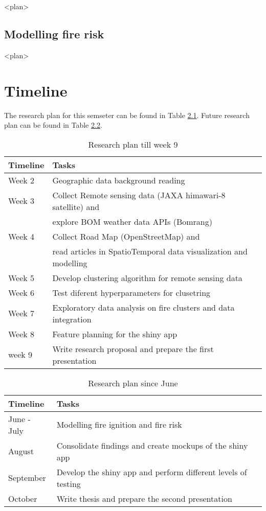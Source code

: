\documentclass{monashthesis}
\begin{document}
\textless{}plan\textgreater{}

\section{Modelling fire risk}\label{modelling-fire-risk}

\textless{}plan\textgreater{}

\chapter{Timeline}\label{timeline}

The research plan for this semseter can be found in Table
\ref{tab:timeline1}. Future research plan can be found in Table
\ref{tab:timeline2}.

\begin{table}[!h]

\caption{\label{tab:timeline1}Research plan till week 9}
\centering
\begin{tabular}{ll}
\toprule
Timeline & Tasks\\
\midrule
Week 2 & Geographic data background reading\\
Week 3 & Collect Remote sensing data (JAXA himawari-8 satellite) and\\
 & explore BOM weather data APIs (Bomrang)\\
Week 4 & Collect Road Map (OpenStreetMap) and\\
 & read articles in SpatioTemporal data visualization and modelling\\
\addlinespace
Week 5 & Develop clustering algorithm for remote sensing data\\
Week 6 & Test diferent hyperparameters for clusetring\\
Week 7 & Exploratory data analysis on fire clusters and data integration\\
Week 8 & Feature planning for the shiny app\\
week 9 & Write research proposal and prepare the first presentation\\
\bottomrule
\end{tabular}
\end{table}

\begin{table}[!h]

\caption{\label{tab:timeline2}Research plan since June}
\centering
\begin{tabular}{ll}
\toprule
Timeline & Tasks\\
\midrule
June - July & Modelling fire ignition and fire risk\\
August & Consolidate findings and create mockups of the shiny app\\
September & Develop the shiny app and perform different levels of testing\\
October & Write thesis and prepare the second presentation\\
\bottomrule
\end{tabular}
\end{table}
\end{document}
